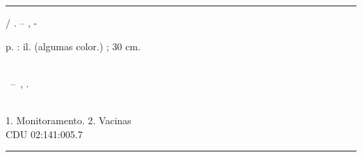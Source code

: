 \begin{fichacatalografica}
  \vspace*{\fill}                 %
  \hrule                          %
  \begin{center}                  %
    \begin{minipage}[c]{12.5cm}   %

      \imprimirautor

      \hspace{0.5cm} \imprimirtitulo  / \imprimirautor. --
      \imprimirlocal, \imprimirdata-

      \hspace{0.5cm} \pageref{LastPage} p. : il. (algumas color.) ; 30 cm.\\

      \hspace{0.5cm} \imprimirorientadorRotulo~\imprimirorientador\\

      \hspace{0.5cm}
      \parbox[t]{\textwidth}{\imprimirtipotrabalho~--~\imprimirinstituicao,
        \imprimirdata.}\\

      \hspace{0.5cm}
      1. Monitoramento.
      2. Vacinas\\

      \hspace{8.75cm} CDU 02:141:005.7\\

    \end{minipage}
  \end{center}
  \hrule
\end{fichacatalografica}
